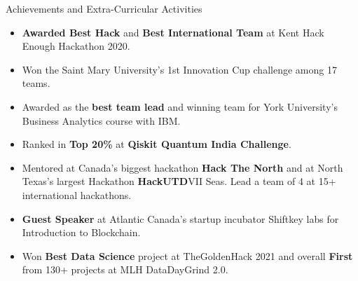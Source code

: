 \documentclass{resume} %
\begin{document}


\begin{rSection}{Achievements and Extra-Curricular Activities} 
\begin{itemize}
    \item \textbf{Awarded Best Hack} and \textbf{Best International Team} at Kent Hack Enough Hackathon 2020.
    \item Won the Saint Mary University's 1st Innovation Cup challenge among 17 teams. 
    \item Awarded as the \textbf{best team lead} and winning team for York University's Business Analytics course with IBM.
    \item Ranked in \textbf{Top 20\%} at \textbf{Qiskit Quantum India Challenge}.
    \item Mentored at Canada's biggest hackathon \textbf{Hack The North} and at North Texas's largest Hackathon \textbf{HackUTD}VII Seas. Lead a team of 4 at 15+ international hackathons.
    \item \textbf{Guest Speaker} at Atlantic Canada’s startup incubator Shiftkey labs for Introduction to Blockchain.
    \item Won \textbf{Best Data Science} project at TheGoldenHack 2021 and overall \textbf{First} from 130+ projects at MLH DataDayGrind 2.0. 
\end{itemize}
\end{rSection}
\end{document}
